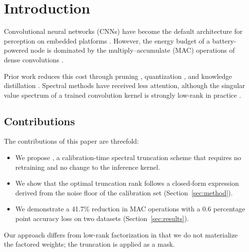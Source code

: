 \section{Introduction}
\label{sec:intro}

Convolutional neural networks (CNNs) have become the default architecture for
perception on embedded platforms \citep{lecun2015deep,he2016deep}. However, the
energy budget of a battery-powered node is dominated by the multiply--accumulate
(MAC) operations of dense convolutions \citep{horowitz2014computing}.

Prior work reduces this cost through pruning \citep{han2015learning}, quantization
\citep{jacob2018quantization}, and knowledge distillation \citep{hinton2015distilling}.
Spectral methods have received less attention, although the singular value spectrum
of a trained convolution kernel is strongly low-rank in practice
\citep{denton2014exploiting,zhang2016accelerating}.

\subsection{Contributions}
The contributions of this paper are threefold:

\begin{itemize}
  \item We propose \method{}, a calibration-time spectral truncation scheme that
        requires no retraining and no change to the inference kernel.
  \item We show that the optimal truncation rank follows a closed-form expression
        derived from the noise floor of the calibration set (Section~\ref{sec:method}).
  \item We demonstrate a 41.7\% reduction in MAC operations with a 0.6 percentage
        point accuracy loss on two datasets (Section~\ref{sec:results}).
\end{itemize}

Our approach differs from low-rank factorization \citep{zhang2016accelerating} in that
we do not materialize the factored weights; the truncation is applied as a mask.
